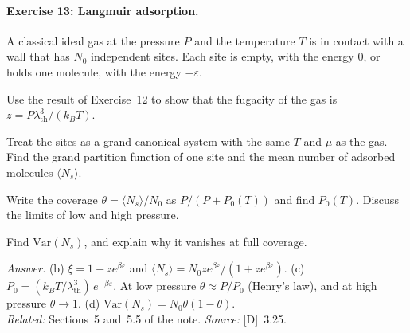 \documentclass[11pt]{article}      %
\numberwithin{equation}{section}   %
\begin{document}
\paragraph{Exercise 13: Langmuir adsorption.}
A classical ideal gas at the pressure $P$ and the temperature $T$ is in contact with a wall that has $N_0$ independent sites. Each site is empty, with the energy $0$, or holds one molecule, with the energy $-\varepsilon$.
\begin{parts}
    \item Use the result of Exercise~12 to show that the fugacity of the gas is $z = P\lambda_{\text{th}}^3/(k_BT)$.
    \item Treat the sites as a grand canonical system with the same $T$ and $\mu$ as the gas. Find the grand partition function of one site and the mean number of adsorbed molecules $\langle N_s\rangle$.
    \item Write the coverage $\theta = \langle N_s\rangle/N_0$ as $P/(P + P_0(T))$ and find $P_0(T)$. Discuss the limits of low and high pressure.
    \item Find $\mathrm{Var}(N_s)$, and explain why it vanishes at full coverage.
\end{parts}
\textit{Answer.} (b) $\xi = 1 + z e^{\beta\varepsilon}$ and $\langle N_s\rangle = N_0 z e^{\beta\varepsilon}/(1 + z e^{\beta\varepsilon})$. (c) $P_0 = (k_BT/\lambda_{\text{th}}^3)\,e^{-\beta\varepsilon}$. At low pressure $\theta \approx P/P_0$ (Henry's law), and at high pressure $\theta \to 1$. (d) $\mathrm{Var}(N_s) = N_0\theta(1 - \theta)$.\\
\textit{Related:} Sections~5 and~5.5 of the note. \textit{Source:} [D]~3.25.
\end{document}
